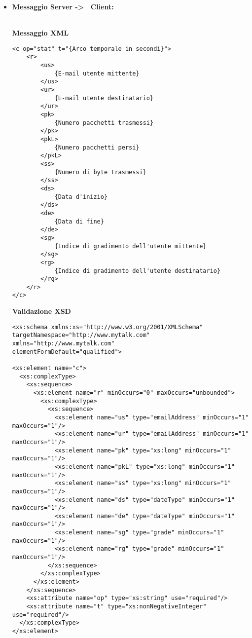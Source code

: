 {{\begin{itemize}
{\begin{lstlisting}
<xs:simpleType name="emailAddress"> 
    <xs:restriction base="xs:string"> 
      <xs:pattern value="[^@]+@[^\.]+\..+"/> 
    </xs:restriction> 
</xs:simpleType>

<xs:simpleType name="dateType">
   <xs:restriction base="xs:string">
       <xs:pattern value="\d{14}"/>
   </xs:restriction>
</xs:simpleType>

<xs:simpleType name="grade">
   <xs:restriction base="xs:byte">
       <xs:minInclusive value="0"/>
       <xs:maxInclusive value="5"/>
   </xs:restriction>
</xs:simpleType>

</xs:schema>
				\end{lstlisting}
				Almeno uno degli elementi interni deve essere presente.
				}
				
				\item[] \textbf{Messaggio Server -\textgreater~ Client:}{\\
				\textbf{Messaggio XML}\\
				\begin{lstlisting}
<c op="stat" t="{Arco temporale in secondi}">
	<r>
		<us>
			{E-mail utente mittente}
		</us>
		<ur>
			{E-mail utente destinatario}
		</ur>
		<pk>
			{Numero pacchetti trasmessi}
		</pk>
		<pkL>
			{Numero pacchetti persi}
		</pkL>
		<ss>
			{Numero di byte trasmessi}
		</ss>
		<ds>
			{Data d'inizio}
		</ds>
		<de>
			{Data di fine}
		</de>
		<sg>
			{Indice di gradimento dell'utente mittente}
		</sg>
		<rg>
			{Indice di gradimento dell'utente destinatario}
		</rg>
	</r>
</c>
				\end{lstlisting}
				\textbf{Validazione XSD}\\
				\begin{lstlisting}
<xs:schema xmlns:xs="http://www.w3.org/2001/XMLSchema"
targetNamespace="http://www.mytalk.com"
xmlns="http://www.mytalk.com"
elementFormDefault="qualified">

<xs:element name="c">
  <xs:complexType>
    <xs:sequence>
      <xs:element name="r" minOccurs="0" maxOccurs="unbounded">
        <xs:complexType>
          <xs:sequence>
            <xs:element name="us" type="emailAddress" minOccurs="1" maxOccurs="1"/>
            <xs:element name="ur" type="emailAddress" minOccurs="1" maxOccurs="1"/>
            <xs:element name="pk" type="xs:long" minOccurs="1" maxOccurs="1"/>
            <xs:element name="pkL" type="xs:long" minOccurs="1" maxOccurs="1"/>
            <xs:element name="ss" type="xs:long" minOccurs="1" maxOccurs="1"/>
            <xs:element name="ds" type="dateType" minOccurs="1" maxOccurs="1"/>
            <xs:element name="de" type="dateType" minOccurs="1" maxOccurs="1"/>
            <xs:element name="sg" type="grade" minOccurs="1" maxOccurs="1"/>
            <xs:element name="rg" type="grade" minOccurs="1" maxOccurs="1"/>
          </xs:sequence>
        </xs:complexType>
      </xs:element>
    </xs:sequence>
    <xs:attribute name="op" type="xs:string" use="required"/>
    <xs:attribute name="t" type="xs:nonNegativeInteger" use="required"/>
  </xs:complexType>
</xs:element>


\end{lstlisting}}
\end{itemize}}}
